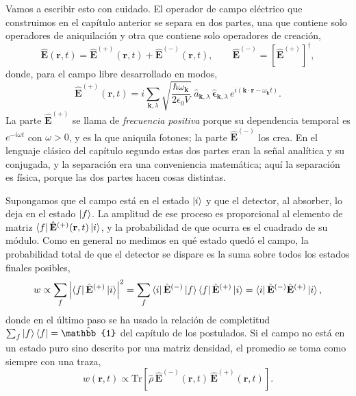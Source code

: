     Vamos a escribir esto con cuidado. El operador de campo eléctrico que construimos en el capítulo anterior se separa en dos partes, una que contiene solo operadores de aniquilación y otra que contiene solo operadores de creación,
    \begin{equation}\label{eq:CampoPartes}
        \hat{\mathbf{E}}(\mathbf{r},t) = \hat{\mathbf{E}}^{(+)}(\mathbf{r},t) + \hat{\mathbf{E}}^{(-)}(\mathbf{r},t),
        \qquad
        \hat{\mathbf{E}}^{(-)} = \left[\hat{\mathbf{E}}^{(+)}\right]^{\dagger},
    \end{equation}
    donde, para el campo libre desarrollado en modos,
    \begin{equation}\label{eq:CampoPositiva}
        \hat{\mathbf{E}}^{(+)}(\mathbf{r},t) = i\sum_{\mathbf{k},\lambda}\sqrt{\frac{\hbar\omega_{\mathbf{k}}}{2\epsilon_{0}V}}\;\hat{a}_{\mathbf{k},\lambda}\,\hat{\boldsymbol{\epsilon}}_{\mathbf{k},\lambda}\,e^{i(\mathbf{k}\cdot\mathbf{r}-\omega_{\mathbf{k}}t)} .
    \end{equation}
    La parte $\hat{\mathbf{E}}^{(+)}$ se llama de \textit{frecuencia positiva} porque su dependencia temporal es $e^{-i\omega t}$ con $\omega>0$, y es la que aniquila fotones; la parte $\hat{\mathbf{E}}^{(-)}$ los crea. En el lenguaje clásico del capítulo segundo estas dos partes eran la señal analítica y su conjugada, y la separación era una conveniencia matemática; aquí la separación es física, porque las dos partes hacen cosas distintas.

    Supongamos que el campo está en el estado $\ket{i}$ y que el detector, al absorber, lo deja en el estado $\ket{f}$. La amplitud de ese proceso es proporcional al elemento de matriz $\bra{f}\hat{\mathbf{E}}^{(+)}(\mathbf{r},t)\ket{i}$, y la probabilidad de que ocurra es el cuadrado de su módulo. Como en general no medimos en qué estado quedó el campo, la probabilidad total de que el detector se dispare es la suma sobre todos los estados finales posibles,
    \begin{equation}\label{eq:SumaFinales}
        w \propto \sum_{f}\left|\bra{f}\hat{\mathbf{E}}^{(+)}\ket{i}\right|^{2}
        = \sum_{f}\bra{i}\hat{\mathbf{E}}^{(-)}\ket{f}\bra{f}\hat{\mathbf{E}}^{(+)}\ket{i}
        = \bra{i}\hat{\mathbf{E}}^{(-)}\hat{\mathbf{E}}^{(+)}\ket{i},
    \end{equation}
    donde en el último paso se ha usado la relación de completitud $\sum_{f}\ket{f}\bra{f}=\hat{\mathbb{1}}$ del capítulo de los postulados. Si el campo no está en un estado puro sino descrito por una matriz densidad, el promedio se toma como siempre con una traza,
    \begin{equation}\label{eq:TasaDeteccion}
        w(\mathbf{r},t) \propto \mathrm{Tr}\left[\hat{\rho}\,\hat{\mathbf{E}}^{(-)}(\mathbf{r},t)\,\hat{\mathbf{E}}^{(+)}(\mathbf{r},t)\right] .
    \end{equation}


